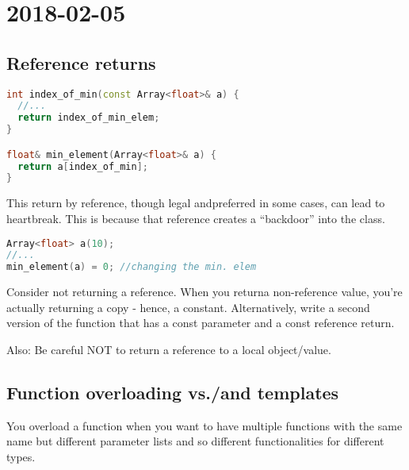 \section{2018-02-05}

\subsection{Reference returns}

\begin{lstlisting}[language=C++]
int index_of_min(const Array<float>& a) {
  //...
  return index_of_min_elem;
}

float& min_element(Array<float>& a) {
  return a[index_of_min];
}
\end{lstlisting}

This return by reference, though legal andpreferred in some cases, can lead to heartbreak. This is because that reference creates a ``backdoor'' into the class.

\begin{lstlisting}[language=C++]
Array<float> a(10);
//...
min_element(a) = 0; //changing the min. elem
\end{lstlisting}

Consider not returning a reference. When you returna non-reference value, you're actually returning a copy - hence, a constant. Alternatively, write a second version of the function that has a const parameter and a const reference return.

Also: Be careful NOT to return a reference to a local object/value.


\subsection{Function overloading vs./and templates}

You overload a function when you want to have multiple functions with the same name but different parameter lists and so different functionalities for different types.


